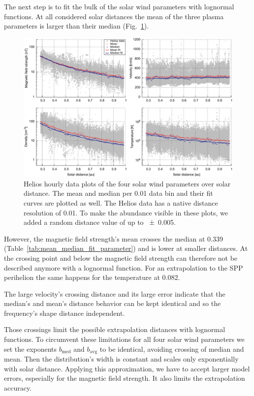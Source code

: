 The next step is to fit the bulk of the solar wind parameters with lognormal functions. At all considered solar distances the mean of the three plasma parameters is larger than their median (Fig.~\ref{fig:radial_fit_4_thesis_light_skip_pdfcairo_plot}).
\begin{figure}
	\includegraphics[width=18cm]{figures/radial_fit_4_thesis_light_skip_pdfcairo_plot.pdf}
	\caption{Helios hourly data plots of the four solar wind parameters over solar distance. The mean and median per \SI{0.01}{\au} data bin and their fit curves are plotted as well. The Helios data has a native distance resolution of \SI{0.01}{\au}. To make the abundance visible in these plots, we added a random distance value of up to \SI{+-0.005}{\au}.}
	\label{fig:radial_fit_4_thesis_light_skip_pdfcairo_plot}
\end{figure}
However, the magnetic field strength's mean crosses the median at \SI{0.339}{\au} (Table~\ref{tab:mean_median_fit_parameter}) and is lower at smaller distances. At the crossing point and below the magnetic field strength can therefore not be described anymore with a lognormal function. For an extrapolation to the SPP perihelion the same happens for the temperature at \SI{0.082}{\au}.

The large velocity's crossing distance and its large error indicate that the median's and mean's distance behavior can be kept identical and so the frequency's shape distance independent.

Those crossings limit the possible extrapolation distances with lognormal functions. To circumvent these limitations for all four solar wind parameters we set the exponents $b_\text{med}$ and $b_\text{avg}$ to be identical, avoiding crossing of median and mean. Then the distribution's width is constant and scales only exponentially with solar distance. Applying this approximation, we have to accept larger model errors, especially for the magnetic field strength. It also limits the extrapolation accuracy.

